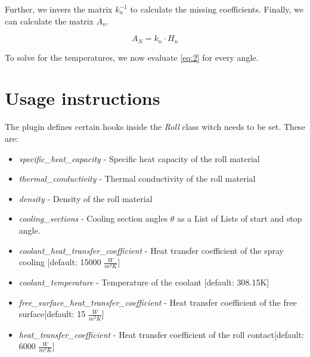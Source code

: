 \documentclass[11pt]{PyRollDocs}
\begin{document}
    Further, we invers the matrix $k_n^{-1}$ to calculate the missing coefficients.
    Finally, we can calculate the matrix $A_n$.
    
    \begin{equation}
        A_N = k_n \cdot H_n
        \label{eq:12}
    \end{equation}
    
    To solve for the temperatures, we now evaluate \autoref{eq:2} for every angle.

    \section{Usage instructions}\label{sec:usage-instructions}
    
    The plugin defines certain hooks inside the \emph{Roll} class witch needs to be set.
    These are:
    \begin{itemize}
        \item \emph{specific\_heat\_capacity} - Specific heat capacity of the roll material
        \item \emph{thermal\_conductivity} - Thermal conductivity of the roll material
        \item \emph{density} - Density of the roll material
        \item \emph{cooling\_sections} - Cooling section angles $\theta$ as a List of Lists of start and stop angle.
        \item \emph{coolant\_heat\_transfer\_coefficient} - Heat transfer coefficient of the spray cooling [default: 15000 $\frac{W}{m^2 K}$]
        \item \emph{coolant\_temperature} - Temperature of the coolant [default: 308.15K]
        \item \emph{free\_surface\_heat\_transfer\_coefficient} - Heat transfer coefficient of the free surface[default: 15 $\frac{W}{m^2 K}$]
        \item \emph{heat\_transfer\_coefficient} - Heat transfer coefficient of the roll contact[default: 6000 $\frac{W}{m^2 K}$]
    \end{itemize}



    \printbibliography
\end{document}
